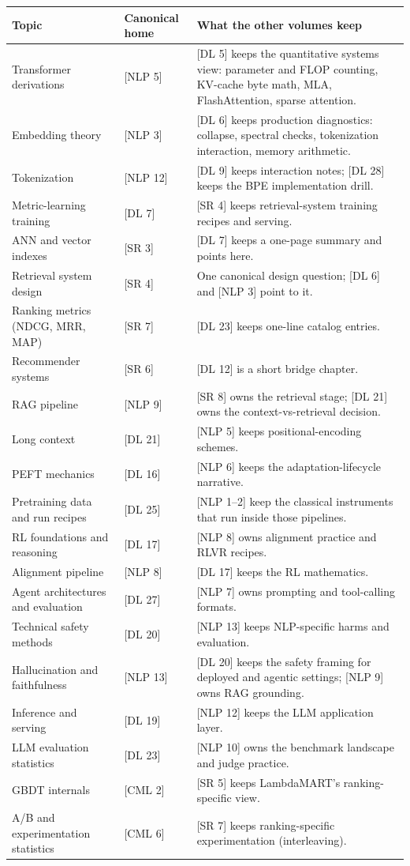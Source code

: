 \begin{tabularx}{\textwidth}{@{}l l X@{}}
\toprule
\textbf{Topic} & \textbf{Canonical home} & \textbf{What the other volumes keep} \\
\midrule
Transformer derivations & [NLP 5] & [DL 5] keeps the quantitative systems view: parameter and FLOP counting, KV-cache byte math, MLA, FlashAttention, sparse attention. \\
Embedding theory & [NLP 3] & [DL 6] keeps production diagnostics: collapse, spectral checks, tokenization interaction, memory arithmetic. \\
Tokenization & [NLP 12] & [DL 9] keeps interaction notes; [DL 28] keeps the BPE implementation drill. \\
Metric-learning training & [DL 7] & [SR 4] keeps retrieval-system training recipes and serving. \\
ANN and vector indexes & [SR 3] & [DL 7] keeps a one-page summary and points here. \\
Retrieval system design & [SR 4] & One canonical design question; [DL 6] and [NLP 3] point to it. \\
Ranking metrics (NDCG, MRR, MAP) & [SR 7] & [DL 23] keeps one-line catalog entries. \\
Recommender systems & [SR 6] & [DL 12] is a short bridge chapter. \\
RAG pipeline & [NLP 9] & [SR 8] owns the retrieval stage; [DL 21] owns the context-vs-retrieval decision. \\
Long context & [DL 21] & [NLP 5] keeps positional-encoding schemes. \\
PEFT mechanics & [DL 16] & [NLP 6] keeps the adaptation-lifecycle narrative. \\
Pretraining data and run recipes & [DL 25] & [NLP 1--2] keep the classical instruments that run inside those pipelines. \\
RL foundations and reasoning & [DL 17] & [NLP 8] owns alignment practice and RLVR recipes. \\
Alignment pipeline & [NLP 8] & [DL 17] keeps the RL mathematics. \\
Agent architectures and evaluation & [DL 27] & [NLP 7] owns prompting and tool-calling formats. \\
Technical safety methods & [DL 20] & [NLP 13] keeps NLP-specific harms and evaluation. \\
Hallucination and faithfulness & [NLP 13] & [DL 20] keeps the safety framing for deployed and agentic settings; [NLP 9] owns RAG grounding. \\
Inference and serving & [DL 19] & [NLP 12] keeps the LLM application layer. \\
LLM evaluation statistics & [DL 23] & [NLP 10] owns the benchmark landscape and judge practice. \\
GBDT internals & [CML 2] & [SR 5] keeps LambdaMART's ranking-specific view. \\
A/B and experimentation statistics & [CML 6] & [SR 7] keeps ranking-specific experimentation (interleaving). \\
\bottomrule
\end{tabularx}

